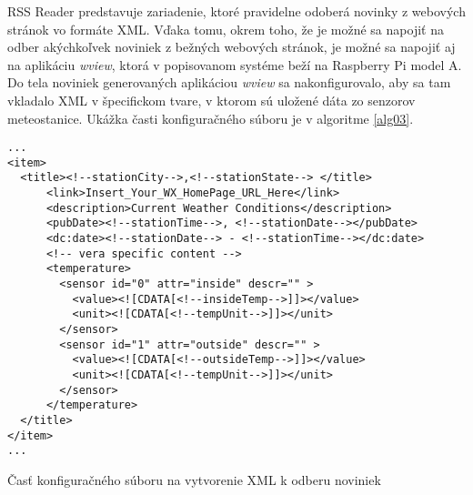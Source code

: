 \indent RSS Reader predstavuje zariadenie, ktoré pravidelne odoberá novinky z webových stránok vo formáte XML. Vďaka tomu, okrem toho, že je možné sa napojiť na odber akýchkoľvek noviniek z bežných webových stránok, je možné sa napojiť aj na aplikáciu \textit{wview}, ktorá v popisovanom systéme beží na Raspberry Pi model A. Do tela noviniek generovaných aplikáciou \textit{wview} sa nakonfigurovalo, aby sa tam vkladalo XML v špecifickom tvare, v ktorom sú uložené dáta zo senzorov meteostanice. 
Ukážka časti konfiguračného súboru je v algoritme \ref{alg03}.
\begin{algorithm}
%
\begin{lstlisting}
...
<item>
  <title><!--stationCity-->,<!--stationState--> </title>
      <link>Insert_Your_WX_HomePage_URL_Here</link>
      <description>Current Weather Conditions</description>
      <pubDate><!--stationTime-->, <!--stationDate--></pubDate>
      <dc:date><!--stationDate--> - <!--stationTime--></dc:date>
	  <!-- vera specific content -->
	  <temperature>
	    <sensor id="0" attr="inside" descr="" >
		  <value><![CDATA[<!--insideTemp-->]]></value>
		  <unit><![CDATA[<!--tempUnit-->]]></unit>
		</sensor>
	    <sensor id="1" attr="outside" descr="" >
		  <value><![CDATA[<!--outsideTemp-->]]></value>
		  <unit><![CDATA[<!--tempUnit-->]]></unit>
		</sensor>
	  </temperature>
  </title>
</item>
...
\end{lstlisting}
 \caption{Časť konfiguračného súboru na vytvorenie XML k odberu noviniek}
 \label{alg03}
\end{algorithm}

